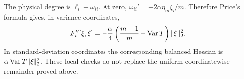 \begin{remark}
The physical degree is $\ell_i-\omega_{ii}$. At zero,
$\omega_{ii}'=-2\alpha\eta_m\xi_i/m$. Therefore Price's formula
gives, in variance coordinates,
\[
 F_v''[\xi,\xi]
       =-\frac\alpha4\left(\frac{m-1}{m}-\operatorname{Var} T\right)\lVert \xi\rVert_2^2.
\]
In standard-deviation coordinates the corresponding balanced Hessian
is $\alpha\operatorname{Var} T\lVert \xi\rVert_2^2$. These local checks do not replace the
uniform coordinatewise remainder proved above.
\end{remark}
